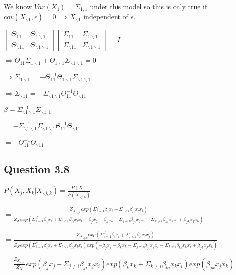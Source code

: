 \documentclass[
]{article}
\begin{document}
We know \(Var(X_1)=\Sigma_{1,1}\) under this model so this is only true
if \(cov(X_{\backslash1},\epsilon) = 0 \implies X_{\backslash1}\)
independent of \(\epsilon\).

\(\begin{bmatrix}\Theta_{11} & \Theta_{1\backslash1}\\ \Theta_{\backslash11} & \Theta_{\backslash1\backslash1} \end{bmatrix} \begin{bmatrix}\Sigma_{11} & \Sigma_{1\backslash1}\\ \Sigma_{\backslash11} & \Sigma_{\backslash1\backslash1} \end{bmatrix} = I\)

\(\Rightarrow \Theta_{11}\Sigma_{1\backslash1} + \Theta_{1\backslash1}\Sigma_{\backslash1\backslash1}=0\)

\(\Rightarrow \Sigma_{1\backslash1} = -\Theta^{-1}_{11}\Theta_{1\backslash1}\Sigma_{\backslash1\backslash1}\)

\(\Rightarrow \Sigma_{\backslash11} = -\Sigma_{\backslash1\backslash1}\Theta^{-1}_{11}\Theta_{\backslash11}\)

\(\beta = \Sigma^{-1}_{\backslash1\backslash1}\Sigma_{\backslash1,1}\)

\(=-\Sigma^{-1}_{\backslash1\backslash1}\Sigma_{\backslash1\backslash1}\Theta^{-1}_{11}\Theta_{\backslash11}\)

\(=-\Theta^{-1}_{11}\Theta_{\backslash11}\)

\hypertarget{question-3.8}{%
\subsection{Question 3.8}\label{question-3.8}}

\(P(X_j, X_k | X_{\backslash j,k}) = \frac{P(X)}{P(X_{\backslash j,k})}\)

\(= \frac{Z_{X_{\backslash j,k}}exp(\Sigma^d_{i=1}\beta_ix_i+\Sigma_{l<i}\beta_{li}x_lx_i)}{Z_Xexp(\Sigma^d_{i=1}\beta_ix_i+\Sigma_{l<i}\beta_{li}x_lx_i-\beta_jx_j-\beta_kx_k-\Sigma_{j\neq i}\beta_{ji}x_jx_i-\Sigma_{k\neq i}\beta_{ki}x_kx_i+\beta_{jk}x_jx_k)}\)

\(= \frac{Z_{X_{\backslash j,k}}exp(\Sigma^d_{i=1}\beta_ix_i+\Sigma_{l<i}\beta_{li}x_lx_i)}{Z_Xexp(\Sigma^d_{i=1}\beta_ix_i+\Sigma_{l<i}\beta_{li}x_lx_i)exp(-\beta_jx_j-\beta_kx_k-\Sigma_{j\neq i}\beta_{ji}x_jx_i-\Sigma_{k\neq i}\beta_{ki}x_kx_i+\beta_{jk}x_jx_k)}\)

\(= \frac{Z_{X_{\backslash j,k}}}{Z_X}exp(\beta_jx_j+\Sigma_{j\neq i}\beta_{ji}x_jx_i)exp(\beta_kx_k+\Sigma_{k\neq i}\beta_{ki}x_kx_i)exp(\beta_{jk}x_jx_k)\)
\end{document}
